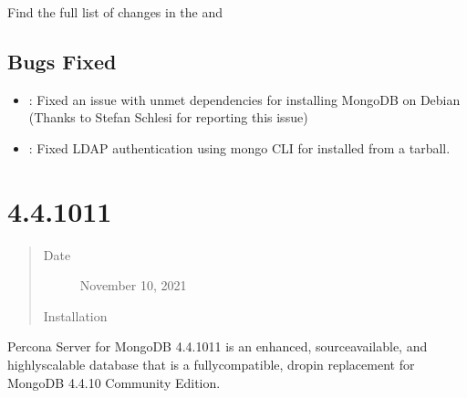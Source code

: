 \documentclass[letterpaper,10pt,english]{sphinxmanual}
\begin{document}
\sphinxAtStartPar
Find the full list of changes in the  and 


\subsection{Bugs Fixed}
\label{\detokenize{release_notes/4.4.12-12:bugs-fixed}}\begin{itemize}
\item {} 
\sphinxAtStartPar
{}: Fixed an issue with unmet dependencies for installing MongoDB on Debian (Thanks to Stefan Schlesi for reporting this issue)

\item {} 
\sphinxAtStartPar
{}: Fixed LDAP authentication using mongo CLI for  installed from a tarball.

\end{itemize}


\section{ 4.4.10\sphinxhyphen{}11}
\label{\detokenize{release_notes/4.4.10-11:percona-server-for-mongodb-4-4-10-11}}\label{\detokenize{release_notes/4.4.10-11:psmdb-4-4-10-11}}\label{\detokenize{release_notes/4.4.10-11::doc}}\begin{quote}\begin{description}
\item[{Date}] \leavevmode
\sphinxAtStartPar
November 10, 2021

\item[{Installation}] \leavevmode
\sphinxAtStartPar
{}

\end{description}\end{quote}

\sphinxAtStartPar
Percona Server for MongoDB 4.4.10\sphinxhyphen{}11 is an enhanced, source\sphinxhyphen{}available, and highly\sphinxhyphen{}scalable database that is a
fully\sphinxhyphen{}compatible, drop\sphinxhyphen{}in replacement for MongoDB 4.4.10 Community Edition.
\end{document}
